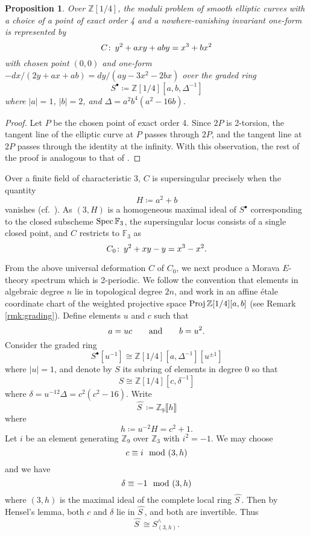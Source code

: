 \documentclass{gtpart}
\newtheorem{prop}[thm]{Proposition}
\theoremstyle{definition}
\theoremstyle{remark}
\def\co{\colon\thinspace}
\newcommand{\mb}[1]{\mathbb{#1}}
\newcommand{\Spec}{{\rm Spec\thinspace}}
\newcommand{\Proj}{{\rm Proj\thinspace}}
\newcommand{\BF}{{\mb F}}
\newcommand{\BZ}{{\mb Z}}
\newcommand{\HS}{\widehat{S~}\!}
\newcommand{\md}{~~{\rm mod}~}
\newcommand{\ad}{{\rm and}}
\newcommand{\s}{S^\bullet}
\begin{document}
\begin{prop}
\label{prop:C}
 Over $\BZ [1/4]$, the moduli problem of smooth elliptic curves with a 
 choice of a point of exact order 4 and a nowhere-vanishing invariant 
 one-form is represented by 
 \begin{equation}
 \label{Cxy}
  C \co y^2 + a x y + a b y = x^3 + b x^2 
 \end{equation}
 with chosen point $(0,0)$ and one-form 
 $-dx / (2 y + a x + a b) = dy / (a y - 3 x^2 - 2 b x)$ over the graded 
 ring 
 \[
  \s \coloneqq \BZ [1/4] [a, b, \Delta^{-1}] 
 \]
 where $|a| = 1$, $|b| = 2$, and $\Delta = a^2 b^4 (a^2 - 16 b)$.  
\end{prop}
\begin{proof}
 Let $P$ be the chosen point of exact order 4.  Since $2P$ is 2-torsion, 
 the tangent line of the elliptic curve at $P$ passes through $2P$, and 
 the tangent line at $2P$ passes through the identity at the infinity.  
 With this observation, the rest of the proof is analogous to that of 
 \cite[Proposition 3.2]{tmf3}.  
\end{proof}

Over a finite field of characteristic 3, $C$ is supersingular precisely 
when the quantity 
\begin{equation}
\label{H}
 H \coloneqq a^2 + b 
\end{equation}
vanishes (cf.~\cite[V.4.1a]{AEC}).  As $(3,H)$ is a homogeneous maximal 
ideal of $\s$ corresponding to the closed subscheme $\Spec \BF_3$, the 
supersingular locus consists of a single closed point, and $C$ restricts 
to $\BF_3$ as 
\[
 C_0 \co y^2 + x y - y = x^3 - x^2.  
\]

From the above universal deformation $C$ of $C_0$, we next produce a 
Morava $E$-theory spectrum which is 2-periodic.  We follow the 
convention that elements in algebraic degree $n$ lie in topological 
degree $2n$, and work in an affine \'etale coordinate chart of the 
weighted projective space $\Proj \BZ [1/4] [a, b]$ (see Remark 
\ref{rmk:grading}).  Define elements $u$ and $c$ such that 
\begin{equation}
\label{uc}
 a = u c \qquad \ad \qquad b = u^2.  
\end{equation}
Consider the graded ring 
\[
 \s [u^{-1}] \cong \BZ [1/4] [a, \Delta^{-1}] [u^{\pm1}] 
\]
where $|u| = 1$, and denote by $S$ its subring of elements in degree 0 
so that 
\begin{equation}
\label{S}
 S \cong \BZ [1/4] [c, \delta^{-1}] 
\end{equation}
where $\delta = u^{-12} \Delta = c^2 (c^2 - 16)$.  Write 
\[
 \HS \coloneqq \BZ_9 \llbracket h \rrbracket 
\]
where 
\begin{equation}
\label{h}
 h \coloneqq u^{-2} H = c^2 + 1.  
\end{equation}
Let $i$ be an element generating $\BZ_9$ over $\BZ_3$ with $i^2 = -1$.  
We may choose 
\[
 c \equiv i \md (3,h) 
\]
and we have 
\[
 \delta \equiv -1 \md (3,h) 
\]
where $(3,h)$ is the maximal ideal of the complete local ring $\HS$.  
Then by Hensel's lemma, both $c$ and $\delta$ lie in $\HS$, and both are 
invertible.  Thus 
\[
 \HS \cong S_{(3,h)}^\wedge.  
\]
\end{document}

